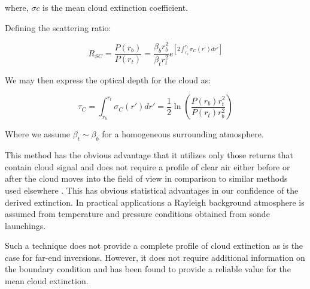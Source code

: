 \noindent
where, $\sigma{c}$ is the mean cloud extinction coefficient.
%

\noindent
Defining the scattering ratio:

\begin{equation}
R_{SC}
= {\frac{{P}(r_b)}{{P}(r_t)}} = 
\frac{{\beta_{b}}{r_{b}^{2}}}{{\beta_{t}}{r_{t}^{2}}}
e^{[2 
{\int_{r_{b}}^{r_{t}}}{\sigma_{C}}(r\prime) dr\prime
]}
\label{ratiopower}
\end{equation}

\noindent
We may then express the optical depth for the cloud as:


\begin{equation}
{\tau_{C}} = {\int_{r_{b}}^{r_{t}} \sigma_{C}(r\prime) dr\prime}
= {\frac{1}{2}} \ln (\frac
{{{P}(r_b)}
{r_{t}^{2}}}
{{{P}(r_t)}
{r_{b}^{2}}})
\label{deeppower}
\end{equation}

\noindent
Where we assume ${\beta_{t}}\sim{\beta_{b}}$ for a 
homogeneous surrounding atmosphere.

This method has the obvious advantage that it utilizes only
those returns that contain cloud signal and does not require
a profile of clear air either before or after the cloud
moves into the field of view in comparison to similar methods used
elsewhere \cite{anunstdwwcb}. This has obvious statistical
advantages in our confidence of the derived extinction.
In practical applications a Rayleigh background atmosphere
is assumed from temperature and pressure conditions obtained
from sonde launchings. 

Such a technique does not provide a
complete profile of cloud extinction
as is the case for 
far-end inversions.
However, it does not require additional information
on the boundary condition and has been found to 
provide a reliable value for the mean cloud extinction.

